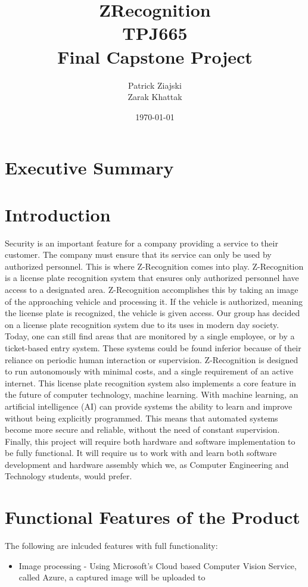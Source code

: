 \documentclass[a4paper,12pt]{article}
\title{ZRecognition \\ TPJ665 \\ Final Capstone Project}
\author{Patrick Ziajski \\ Zarak Khattak}
\date{\today}
\begin{document}
\maketitle
\thispagestyle{empty}

\newpage
\tableofcontents

\newpage
{}
\section{Executive Summary}

\section{Introduction}
Security is an important feature for a company providing a service to their customer. The company must ensure that its service can only be used by authorized personnel. This is where Z-Recognition comes into play. Z-Recognition is a license plate recognition system that ensures only authorized personnel have access to a designated area. Z-Recognition accomplishes this by taking an image of the approaching vehicle and processing it. If the vehicle is authorized, meaning the license plate is recognized, the vehicle is given access. Our group has decided on a license plate recognition system due to its uses in modern day society. Today, one can still find areas that are monitored by a single employee, or by a ticket-based entry system. These systems could be found inferior because of their reliance on periodic human interaction or supervision. Z-Recognition is designed to run autonomously with minimal costs, and a single requirement of an active internet. This license plate recognition system also implements a core feature in the future of computer technology, machine learning. With machine learning, an artificial intelligence (AI) can provide systems the ability to learn and improve without being explicitly programmed. This means that automated systems become more secure and reliable, without the need of constant supervision. Finally, this project will require both hardware and software implementation to be fully functional. It will require us to work with and learn both software development and hardware assembly which we, as Computer Engineering and Technology students, would prefer.

\newpage
\section{Functional Features of the Product}
The following are inlcuded features with full functionality:
\begin{itemize}
    \item Image processing - Using Microsoft's Cloud based Computer Vision Service, called Azure, a captured image will be uploaded to 
\end{itemize}
\end{document}
